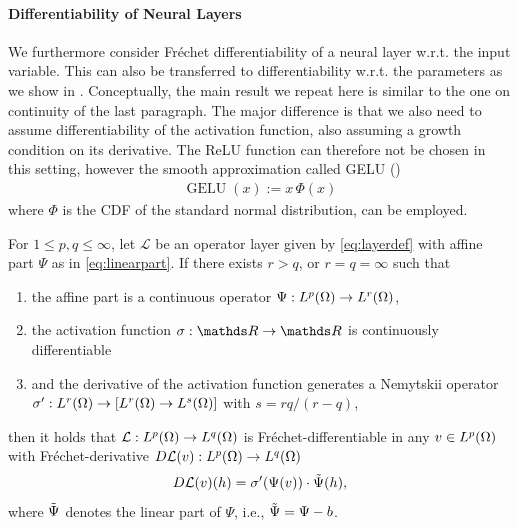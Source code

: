 \paragraph{Differentiability of Neural Layers}
%
%
We furthermore consider Fréchet differentiability of a neural layer w.r.t. the input variable. This can also be transferred to differentiability w.r.t. the parameters as we show in \cite[Ex. 4]{kabri2023resolution}. Conceptually, the main result we repeat here is similar to the one on continuity of the last paragraph. 
The major difference is that we also need to assume differentiability of the activation function, also assuming a growth condition on its derivative. The ReLU function can therefore not be chosen in this setting, however the smooth approximation called GELU (\cite{hen16})
%
\begin{align*}
\operatorname{GELU}(x) := x\, \Phi(x)
\end{align*}
%
where $\Phi$ is the CDF of the standard normal distribution, can be employed.
%
%
\begin{proposition}{\cite[Prop. 2]{kabri2023resolution}}{}
	For $1 \leq p, q \leq \infty$, let $\mathcal{L}$ be an operator layer given by \eqref{eq:layerdef} with affine part $\Psi$ as in \eqref{eq:linearpart}. If there exists $r>q$, or $r = q = \infty$ such that
	\begin{enumerate}[label=(\roman*)]
		\item the affine part is a continuous operator $\Psi: L^p(\Omega) \rightarrow L^r(\Omega)$,
		\item the activation function $\sigma: \R \rightarrow \R$ is continuously differentiable
		\item and the derivative of the activation function generates a Nemytskii operator $\sigma': L^r(\Omega) \rightarrow \left[L^r(\Omega) \rightarrow L^{s}(\Omega) \right]$ with $s = {rq}/{(r-q)}$,
	\end{enumerate}
	then it holds that $\mathcal{L}:  L^p(\Omega) \rightarrow L^q(\Omega)$ is Fréchet-differentiable in any $v \in L^p(\Omega)$ with Fréchet-derivative $D\mathcal{L}(v): L^p(\Omega) \rightarrow L^q(\Omega)$
	\begin{align*}
		D\mathcal{L}(v)(h) = \sigma'(\Psi(v))\cdot\Tilde{\Psi}(h),
	\end{align*}
	where $\Tilde{\Psi}$ denotes the linear part of $\Psi$, i.e., $\Tilde{\Psi} = \Psi - b$.
\end{proposition}
%
%
